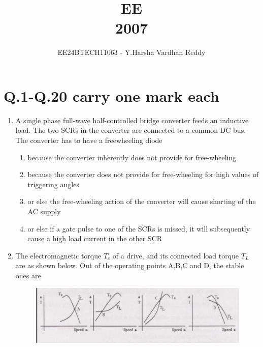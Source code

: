 \documentclass[journal,,12pt,onecolumn]{IEEEtran}
\theoremstyle{remark}
\begin{document}

\vspace{3cm}

\title{EE\\2007}
\author{EE24BTECH11063 - Y.Harsha Vardhan Reddy}
\maketitle

\bigskip

\renewcommand{\thefigure}{\theenumi}
\renewcommand{\thetable}{\theenumi}

\section*{Q.1-Q.20 carry one mark each}

\begin{enumerate}
    \item A single phase full-wave half-controlled bridge converter feeds an inductive load. The two SCRs in the converter are connected to a common DC bus. The converter has to have a freewheeling diode 
    \begin{enumerate}
            \item because the converter inherently does not provide for free-wheeling
            \item because the converter does not provide for free-wheeling for high values of triggering angles
             \item or else the free-wheeling action of the converter will cause shorting of the AC supply
            \item or else if a gate pulse  to one of the SCRs is missed, it will subsequently cause a high load current in the other SCR
    \end{enumerate}
    \bigskip
\item The electromagnetic torque $T_c$ of a drive, and its connected load torque $T_L$ are as shown below. Out of the operating points A,B,C and D, the stable ones are
\begin{figure}[H]
   \centering
   \includegraphics[width=0.7\linewidth]{figs/fig_1.png}
   \label{stemplot}
\end{figure}
\begin{enumerate}

\end{enumerate}
\end{enumerate}
\end{document}
